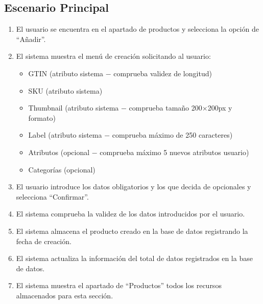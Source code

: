 \documentclass[a4paper,12pt]{article}
\begin{document}
\subsection{Escenario Principal}
\begin{enumerate}
    \item El usuario se encuentra en el apartado de productos y selecciona la opción de \enquote{Añadir}.
    \item El sistema muestra el menú de creación solicitando al usuario:
    \begin{itemize}
        \item GTIN (atributo sistema $-$ comprueba validez de longitud)
        \item SKU (atributo sistema)
        \item Thumbnail (atributo sistema $-$ comprueba tamaño 200$\times$200px y formato)
        \item Label (atributo sistema $-$ comprueba máximo de 250 caracteres)
        \item Atributos (opcional $-$ comprueba máximo 5 nuevos atributos usuario)
        \item Categorías (opcional)
    \end{itemize}
    \item El usuario introduce los datos obligatorios y los que decida de opcionales y selecciona \enquote{Confirmar}.
    \item El sistema comprueba la validez de los datos introducidos por el usuario.
    \item El sistema almacena el producto creado en la base de datos registrando la fecha de creación.
    \item El sistema actualiza la información del total de datos registrados en la base de datos.
    \item El sistema muestra el apartado de \enquote{Productos} todos los recursos almacenados para esta sección.
\end{enumerate}
\end{document}
